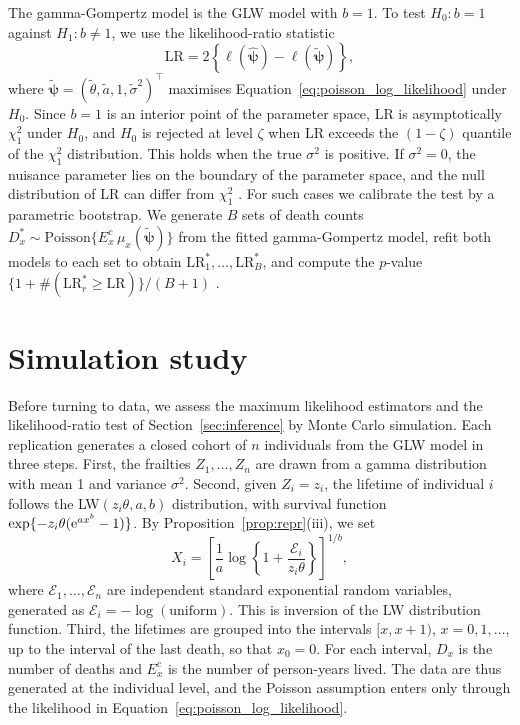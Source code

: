 \documentclass[12pt]{article}
\newcommand{\e}{{\rm e}}         %
\newcommand{\Exp}{\mathcal{E}}   %
\begin{document}
The gamma-Gompertz model is the GLW model with $b=1$. To test $H_0\colon b=1$ against $H_1\colon b\neq1$, we use the likelihood-ratio statistic
\[
\mathrm{LR}=2\left\{\ell(\hat{\bm{\psi}})-\ell(\tilde{\bm{\psi}})\right\},
\]
where $\tilde{\bm{\psi}}=(\tilde\theta,\tilde a,1,\tilde\sigma^2)^\top$ maximises Equation~\eqref{eq:poisson_log_likelihood} under $H_0$. Since $b=1$ is an interior point of the parameter space, LR is asymptotically $\chi^2_1$ under $H_0$, and $H_0$ is rejected at level $\zeta$ when LR exceeds the $(1-\zeta)$ quantile of the $\chi^2_1$ distribution. This holds when the true $\sigma^2$ is positive. If $\sigma^2=0$, the nuisance parameter lies on the boundary of the parameter space, and the null distribution of LR can differ from $\chi^2_1$ \citep{self1987asymptotic}. For such cases we calibrate the test by a parametric bootstrap. We generate $B$ sets of death counts $D_x^\ast\sim\text{Poisson}\{E^c_x\,\mu_x(\tilde{\bm{\psi}})\}$ from the fitted gamma-Gompertz model, refit both models to each set to obtain $\mathrm{LR}^\ast_1,\ldots,\mathrm{LR}^\ast_B$, and compute the $p$-value $\{1+\#(\mathrm{LR}^\ast_r\geq\mathrm{LR})\}/(B+1)$ \citep[Chapter~4]{davison1997bootstrap}.



\section{Simulation study}\label{sec:simulation}

Before turning to data, we assess the maximum likelihood estimators and the likelihood-ratio test of Section~\ref{sec:inference} by Monte Carlo simulation. Each replication generates a closed cohort of $n$ individuals from the GLW model in three steps. First, the frailties $Z_1,\ldots,Z_n$ are drawn from a gamma distribution with mean 1 and variance $\sigma^2$. Second, given $Z_i=z_i$, the lifetime of individual $i$ follows the LW$(z_i\theta,a,b)$ distribution, with survival function $\exp\{-z_i\theta(\e^{ax^b}-1)\}$. By Proposition~\ref{prop:repr}(iii), we set
\[
X_i=\left[\frac1a\log\left\{1+\frac{\Exp_i}{z_i\theta}\right\}\right]^{1/b},
\]
where $\Exp_1,\ldots,\Exp_n$ are independent standard exponential random variables, generated as $\Exp_i=-\log(\text{uniform})$. This is inversion of the LW distribution function. Third, the lifetimes are grouped into the intervals $[x,x+1)$, $x=0,1,\ldots$, up to the interval of the last death, so that $x_0=0$. For each interval, $D_x$ is the number of deaths and $E^c_x$ is the number of person-years lived. The data are thus generated at the individual level, and the Poisson assumption enters only through the likelihood in Equation~\eqref{eq:poisson_log_likelihood}.
\end{document}

